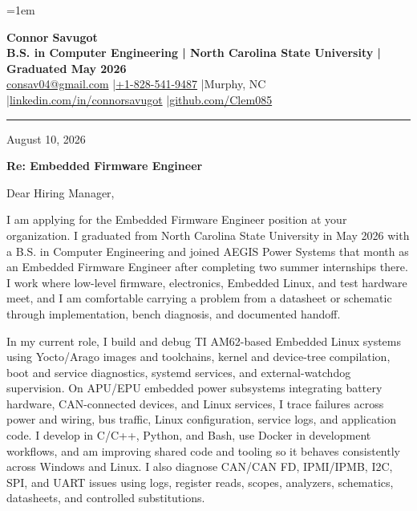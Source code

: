 \documentclass[10pt,letterpaper]{article}
\newcommand{\LetterDate}{August 10, 2026}
\newcommand{\TargetRole}{Embedded Firmware Engineer}
\newcommand{\TargetCompany}{your organization}
\begin{document}
\fontsize{10.35}{12.65}\selectfont
\RaggedRight
\setlength{\RaggedRightRightskip}{0pt plus 5em}
\emergencystretch=1em

\begin{center}
  {\fontsize{22}{23}\selectfont\bfseries Connor Savugot}\\[2pt]
  {\bfseries B.S. in Computer Engineering | North Carolina State University | Graduated May 2026}\\[2pt]
  {\fontsize{9.7}{10.5}\selectfont
    \href{mailto:consav04@gmail.com}{consav04@gmail.com}
    \enspace|\enspace \href{tel:+18285419487}{+1-828-541-9487}
    \enspace|\enspace Murphy, NC
    \enspace|\enspace \href{https://linkedin.com/in/connorsavugot}{linkedin.com/in/connorsavugot}
    \enspace|\enspace \href{https://github.com/Clem085}{github.com/Clem085}}
\end{center}

\vspace{-0.15em}
\hrule
\vspace{0.8em}

\LetterDate

\textbf{Re: \TargetRole}

Dear Hiring Manager,

I am applying for the \TargetRole{} position at \TargetCompany. I graduated from North Carolina State University in May 2026 with a B.S. in Computer Engineering and joined AEGIS Power Systems that month as an Embedded Firmware Engineer after completing two summer internships there. I work where low-level firmware, electronics, Embedded Linux, and test hardware meet, and I am comfortable carrying a problem from a datasheet or schematic through implementation, bench diagnosis, and documented handoff.

In my current role, I build and debug TI AM62-based Embedded Linux systems using Yocto/Arago images and toolchains, kernel and device-tree compilation, boot and service diagnostics, systemd services, and external-watchdog supervision. On APU/EPU embedded power subsystems integrating battery hardware, CAN-connected devices, and Linux services, I trace failures across power and wiring, bus traffic, Linux configuration, service logs, and application code. I develop in C/C++, Python, and Bash, use Docker in development workflows, and am improving shared code and tooling so it behaves consistently across Windows and Linux. I also diagnose CAN/CAN FD, IPMI/IPMB, I2C, SPI, and UART issues using logs, register reads, scopes, analyzers, schematics, datasheets, and controlled substitutions.
\end{document}
